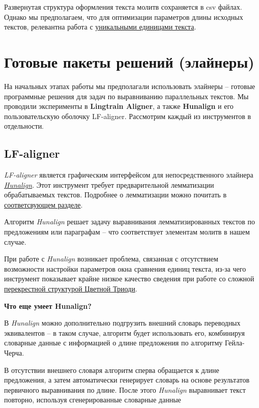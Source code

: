 \documentclass[
  letterpaper,
]{book}
\begin{document}
Развернутая структура оформления текста молитв сохраняется в csv файлах.
Однако мы предполагаем, что для оптимизации параметров длины исходных
текстов, релевантна работа с
\href{https://github.com/Drozhzhinastya/GSPC/tree/main/texts/unique_units}{уникальными
единицами текста}.


\hypertarget{sec-about_aligners}{%
\chapter{Готовые пакеты решений (элайнеры)}\label{sec-about_aligners}}

На начальных этапах работы мы предполагали использовать элайнеры --
готовые программные решения для задач по выравниванию параллельных
текстов. Мы проводили эксперименты в \textbf{Lingtrain Aligner}, а также
\textbf{Hunalign} и его пользовательскую оболочку LF-aligner. Рассмотрим
каждый из инструментов в отдельности.

\hypertarget{sec-lf_aligner}{%
\section{LF-aligner}\label{sec-lf_aligner}}

\emph{LF-aligner} является графическим интерфейсом для непосредственного
элайнера
\emph{\href{https://github.com/danielvarga/hunalign}{Hunalign}}. Этот
инструмент требует предварительной лемматизации обрабатываемых текстов.
Подробнее о лемматизации можно почитать в
\protect\hyperlink{sec-about_lemmatization}{соответсвующем разделе}.

Алгоритм \emph{Hunalign} решает задачу выравнивания лемматизированных
текстов по предложениям или параграфам -- что соответствует элементам
молитв в нашем случае.

При работе с \emph{Hunalign} возникает проблема, связанная с отсутствием
возможности настройки параметров окна сравнения единиц текста, из-за
чего инструмент показывает крайне низкое качество сведения при работе со
сложной \protect\hyperlink{sec-element_order}{перекрестной структурой
Цветной Триоди}.

\begin{tcolorbox}[enhanced jigsaw, toprule=.15mm, colframe=quarto-callout-note-color-frame, colback=white, left=2mm, arc=.35mm, leftrule=.75mm, bottomrule=.15mm, rightrule=.15mm, opacityback=0, breakable]

\textbf{Что еще умеет Hunalign?}\vspace{2mm}

В \emph{Hunalign} можно дополнительно подгрузить внешний словарь
переводных эквивалентов -- в таком случае, алгоритм будет использовать
его, комбинируя словарные данные с информацией о длине предложения по
алгоритму Гейла-Черча.\footnotemark{}

В отсутствии внешнего словаря алгоритм сперва обращается к длине
предложения, а затем автоматически генерирует словарь на основе
результатов первичного выравнивания по длине. После этого
\emph{Hunalign} выравнивает текст повторно, используя сгенерированные
словарные данные

\end{tcolorbox}
\end{document}
